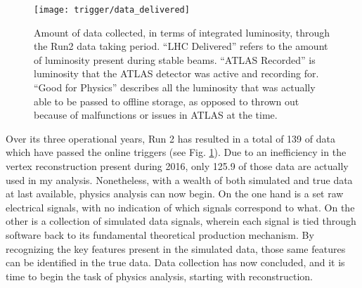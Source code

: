         \begin{figure}[h]
            \texttt{[image: trigger/data\_delivered]}
            \caption{Amount of data collected, in terms of integrated luminosity,
                through the Run2 data taking period\cite{data_quality}.
                ``LHC Delivered'' refers to the amount of luminosity present during stable beams.
                ``ATLAS Recorded'' is luminosity that the ATLAS detector was active and recording for.
                ``Good for Physics'' describes all the luminosity that was actually able to be passed to offline storage,
                    as opposed to thrown out because of malfunctions or issues in ATLAS at the time.
            }
            \label{fig:data_delivered}
        \end{figure}

        Over its three operational years, Run 2 has resulted in a total of 139 \ifb of data which have passed the online triggers
            (see Fig. \ref{fig:data_delivered}).
        Due to an inefficiency in the vertex reconstruction present during 2016,
            only 125.9 \ifb of those data are actually used in my analysis.
        Nonetheless, with a wealth of both simulated and true data at last available, 
            physics analysis can now begin.
        On the one hand is a set raw electrical signals, with no indication of which signals correspond to what.
        On the other is a collection of simulated data signals,
            wherein each signal is tied through software back to its fundamental theoretical production mechanism.
        By recognizing the key features present in the simulated data,
            those same features can be identified in the true data.
        Data collection has now concluded, and it is time to begin the task of physics analysis,
            starting with reconstruction.
